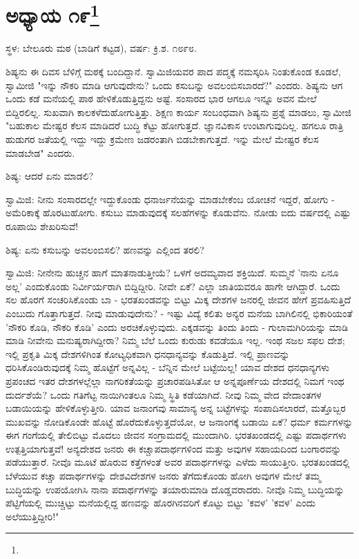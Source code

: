 \newpage

\chapter[ಅಧ್ಯಾಯ ೧೯]{ಅಧ್ಯಾಯ ೧೯\protect\footnote{}}

\begin{center}
ಸ್ಥಳ: ಬೇಲೂರು ಮಠ (ಬಾಡಿಗೆ ಕಟ್ಟಡ), ವರ್ಷ: ಕ್ರಿ.ಶ. ೧೮೯೮.
\end{center}

ಶಿಷ್ಯನು ಈ ದಿವಸ ಬೆಳಿಗ್ಗೆ ಮಠಕ್ಕೆ ಬಂದಿದ್ದಾನೆ. ಸ್ವಾಮಿಜಿಯವರ ಪಾದ ಪದ್ಮಕ್ಕೆ ನಮಸ್ಕರಿಸಿ ನಿಂತುಕೊಂಡ ಕೂಡಲೆ, ಸ್ವಾಮೀಜಿ "ಇನ್ನು ನೌಕರಿ ಮಾಡಿ ಆಗುವುದೇನು? ಒಂದು ಕಸುಬನ್ನು ಅವಲಂಬಿಸಬಾರದೆ?" ಎಂದರು. ಶಿಷ್ಯನು ಆಗ ಒಂದು ಕಡೆ ಮನೆಯಲ್ಲಿ ಪಾಠ ಹೇಳಿಕೊಡುತ್ತಿದ್ದನು ಅಷ್ಟೆ. ಸಂಸಾರದ ಭಾರ ಆಗಲೂ ಇನ್ನೂ ಅವನ ಮೇಲೆ ಬಿದ್ದಿರಲಿಲ್ಲ. ಸುಖವಾಗಿ ಕಾಲಕಳೆದುಹೋಗುತ್ತಿತ್ತು. ಶಿಕ್ಷಣ ಕಾರ್ಯ ಸಂಬಂಧವಾಗಿ ಶಿಷ್ಯನು ಪ್ರಶ್ನೆ ಮಾಡಲು, ಸ್ವಾಮೀಜಿ "ಬಹುಕಾಲ ಮೇಷ್ಟರ ಕೆಲಸ ಮಾಡಿದರೆ ಬುದ್ಧಿ ಕೆಟ್ಟು ಹೋಗುತ್ತದೆ. ಜ್ಞಾನವಿಕಾಸ ಉಂಟಾಗುವುದಿಲ್ಲ. ಹಗಲೂ ರಾತ್ರಿ ಹುಡುಗರ ಜತೆಯಲ್ಲಿ ಇದ್ದು ಇದ್ದು ಕ್ರಮೇಣ ಜಡರಂತಾಗಿ ಬಿಡಬೇಕಾಗುತ್ತದೆ. ಇನ್ನು ಮೇಲೆ ಮೇಷ್ಟರ ಕೆಲಸ ಮಾಡಬೇಡ" ಎಂದರು.

ಶಿಷ್ಯ: ಆದರೆ ಏನು ಮಾಡಲಿ?

ಸ್ವಾಮಿಜಿ: ನೀನು ಸಂಸಾರದಲ್ಲೇ ಇದ್ದುಕೊಂಡು ಧನಾರ್ಜನೆಯನ್ನು ಮಾಡಬೇಕೆಂಬ ಯೋಚನೆ ಇದ್ದರೆ, ಹೋಗು - ಅಮೆರಿಕಾಕ್ಕೆ ಹೊರಟುಹೋಗು. ಕಸುಬು ಮಾಡುವುದಕ್ಕೆ ಸಲಹೆಗಳನ್ನು ಕೊಡುವೆನು. ನೋಡು ಐದು ವರ್ಷದಲ್ಲಿ ಎಷ್ಟು ರೂಪಾಯಿ ಶೇಖರಿಸುವೆ!

ಶಿಷ್ಯ: ಏನು ಕಸುಬನ್ನು ಅವಲಂಬಿಸಲಿ? ಹಣವನ್ನು ಎಲ್ಲಿಂದ ತರಲಿ?

ಸ್ವಾಮಿಜಿ: ನೀನೇನು ಹುಚ್ಚನ ಹಾಗೆ ಮಾತನಾಡುತ್ತೀಯೆ? ಒಳಗೆ ಅದಮ್ಯವಾದ ಶಕ್ತಿಯಿದೆ. ಸುಮ್ಮನೆ 'ನಾನು ಏನೂ ಅಲ್ಲ' ಎಂದುಕೊಂಡು ನಿರ್ವೀರ್ಯರಾಗಿ ಬಿದ್ದಿದ್ದೀರಿ. ನೀವೇ ಏಕೆ? ಎಲ್ಲಾ ಜಾತಿಯವರೂ ಹಾಗೇ ಆಗಿದ್ದಾರೆ. ಒಂದು ಸಲ ಹೊರಗೆ ಸಂಚರಿಸಿಕೊಂಡು ಬಾ - ಭರತಖಂಡವನ್ನು ಬಿಟ್ಟು ಮಿಕ್ಕ ದೇಶಗಳ ಜನರಲ್ಲಿ ಜೀವನ ಹೇಗೆ ಪ್ರವಹಿಸುತ್ತಿದೆ ಎಂಬುದು ಗೊತ್ತಾಗುತ್ತದೆ. ನೀವು ಮಾಡುವುದೇನು? - ಇಷ್ಟು ವಿದ್ಯೆ ಕಲಿತು ಅನ್ಯರ ಮನೆಯ ಬಾಗಿಲಿನಲ್ಲಿ ಭಿಕಾರಿಯಂತೆ 'ನೌಕರಿ ಕೊಡಿ, ನೌಕರಿ ಕೊಡಿ' ಎಂದು ಅರಚಿಕೊಳ್ಳುವುದು. ಎಕ್ಕಡವನ್ನು ತಿಂದು ತಿಂದು - ಗುಲಾಮಗಿರಿಯನ್ನು ಮಾಡಿ ಮಾಡಿ ನೀವೇನು ಮನುಷ್ಯರಾಗಿದ್ದೀರಾ? ನಿಮ್ಮ ಬೆಲೆ ಒಂದು ಕುರುಡು ಕವಡೆಯೂ ಇಲ್ಲ. ಇಂಥ ಸಜಲ ಸಫಲ ದೇಶ; ಇಲ್ಲಿ ಪ್ರಕೃತಿ ಮಿಕ್ಕ ದೇಶಗಳಿಗಿಂತ ಕೋಟ್ಯಧಿಕವಾಗಿ ಧನಧಾನ್ಯವನ್ನು ಕೊಡುತ್ತಿದೆ. ಇಲ್ಲಿ ಪ್ರಾಣವನ್ನು ಧರಿಸಿಕೊಂಡಿರುವುದಕ್ಕೆ ನಿಮ್ಮ ಹೊಟ್ಟೆಗೆ ಅನ್ನವಿಲ್ಲ - ಬೆನ್ನಿನ ಮೇಲೆ ಬಟ್ಟೆಯಿಲ್ಲ! ಯಾವ ದೇಶದ ಧನಧಾನ್ಯಗಳು ಪ್ರಪಂಚದ ಇತರ ದೇಶಗಳಲ್ಲೆಲ್ಲಾ ನಾಗರಿಕತೆಯನ್ನು ಪ್ರಚಾರಪಡಿಸಿತೋ ಆ ಅನ್ನಪೂರ್ಣೆಯ ದೇಶದಲ್ಲಿ ನಿಮಗೆ ಇಂಥ ದುರ್ದಶೆಯೆ? ಒಂದು ಗತಿಗೆಟ್ಟ ನಾಯಿಗಿಂತಲೂ ನಿಮ್ಮ ಸ್ಥಿತಿ ಕಡೆಯಾಗಿದೆ. ನೀವು ನಿಮ್ಮ ವೇದ ವೇದಾಂತಗಳ ಬಡಾಯಿಯನ್ನು ಹೇಳಿಕೊಳ್ಳುತ್ತೀರಿ. ಯಾವ ಜನಾಂಗವು ಸಾಮಾನ್ಯ ಅನ್ನ ಬಟ್ಟೆಗಳನ್ನು ಸಂಪಾದಿಸಲಾರದೆ, ಮತ್ತೊಬ್ಬರ ಮುಖವನ್ನು ನೋಡಿಕೊಂಡೇ ಹೊಟ್ಟೆ ಹೊರೆದುಕೊಳ್ಳುತ್ತದೆಯೋ, ಆ ಜನಾಂಗಕ್ಕೆ ಬಡಾಯಿ ಏಕೆ? ಧರ್ಮ ಕರ್ಮಗಳನ್ನು ಈಗ ಗಂಗೆಯಲ್ಲಿ ತೇಲಿಬಿಟ್ಟು ಮೊದಲು ಜೀವನ ಸಂಗ್ರಾಮದಲ್ಲಿ ಮುಂದಾಗಿರಿ. ಭರತಖಂಡದಲ್ಲಿ ಎಷ್ಟು ಪದಾರ್ಥಗಳು ಉತ್ಪತ್ತಿಯಾಗುತ್ತವೆ! ಅನ್ಯದೇಶದ ಜನರು ಈ ಕಚ್ಚಾಪದಾರ್ಥಗಳಿಂದ ಮತ್ತು ಅವುಗಳ ಸಹಾಯದಿಂದ ಬಂಗಾರವನ್ನು ಪಡೆಯುತ್ತಾರೆ. ನೀವೊ ಮೂಟೆ ಹೊರುವ ಕತ್ತೆಗಳಂತೆ ಅವರ ಪದಾರ್ಥಗಳನ್ನು ಎಳೆದು ಸಾಯುತ್ತೀರಿ. ಭರತಖಂಡದಲ್ಲಿ ಬೆಳೆಯುವ ಕಚ್ಚಾ ಪದಾರ್ಥಗಳನ್ನು ದೇಶವಿದೇಶಗಳ ಜನರು ತೆಗೆದುಕೊಂಡು ಹೋಗಿ ಅವುಗಳ ಮೇಲೆ ತಮ್ಮ ಬುದ್ಧಿಯನ್ನು ಉಪಯೋಗಿಸಿ ನಾನಾ ಪದಾರ್ಥಗಳನ್ನು ತಯಾರುಮಾಡಿ ದೊಡ್ಡವರಾದರು. ನೀವೊ ನಿಮ್ಮ ಬುದ್ಧಿಯನ್ನು ಪೆಟ್ಟಿಗೆಯಲ್ಲಿ ಮುಚ್ಚಿಟ್ಟು ಮನೆಯಲ್ಲಿದ್ದ ಹಣವನ್ನು ಹೊರಗಿನವರಿಗೆ ಕೊಟ್ಟು ಬಿಟ್ಟು 'ಕವಳ' 'ಕವಳ' ಎಂದು ಅಲೆಯುತ್ತಿದ್ದೀರಿ!"

